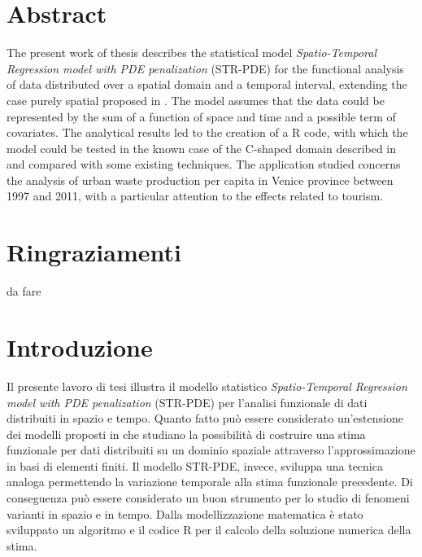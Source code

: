 \documentclass[a4paper,11pt,twoside,openright]{book}							%
\begin{document}
\chapter*{Abstract}
\label{Cap:abstract}
\thispagestyle{empty}
The present work of thesis describes the statistical model \textit{Spatio-Temporal Regression model with PDE penalization} (STR-PDE) for the functional analysis of data distributed over a spatial domain and a temporal interval, extending the case purely spatial proposed in \cite{art:sangalli}. The model assumes that the data could be represented by the sum of a function of space and time and a possible term of covariates. The analytical results led to the creation of a R code, with which the model could be tested in the known case of the C-shaped domain described in \cite{art:ramsay} and compared with some existing techniques. The application studied concerns the analysis of urban waste production per capita in Venice province between 1997 and 2011, with a particular attention to the effects related to tourism.
\newpage
\thispagestyle{empty}

\chapter*{Ringraziamenti}
\thispagestyle{empty}
da fare
\newpage
\thispagestyle{empty}

\frontmatter
\tableofcontents
\listoffigures
\listoftables
\mainmatter
\chapter*{Introduzione}
\label{Cap:intro}

Il presente lavoro di tesi illustra il modello statistico \textit{Spatio-Temporal Regression model with PDE penalization} (STR-PDE) per l'analisi funzionale di dati distribuiti in spazio e tempo. Quanto fatto può essere considerato un'estensione dei modelli proposti in \cite{art:sangalli} che studiano la possibilità di costruire una stima funzionale per dati distribuiti su un dominio spaziale attraverso l'approssimazione in basi di elementi finiti. Il modello STR-PDE, invece, sviluppa una tecnica analoga permettendo la variazione temporale alla stima funzionale precedente. Di conseguenza può essere considerato un buon strumento per lo studio di fenomeni varianti in spazio e in tempo. Dalla modellizzazione matematica è stato sviluppato un algoritmo e il codice R per il calcolo della soluzione numerica della stima.
\end{document}
